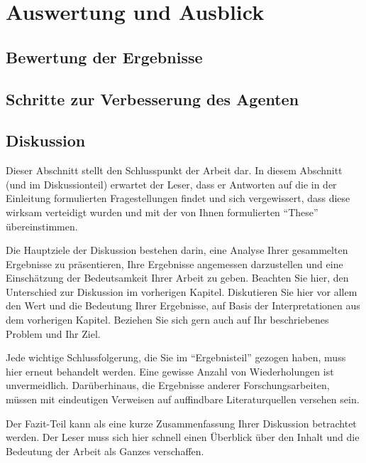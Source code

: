 

\clearpage
\chapter{Auswertung und Ausblick}


\section{Bewertung der Ergebnisse}
\section{Schritte zur Verbesserung des Agenten}
\section{Diskussion}

Dieser Abschnitt stellt den Schlusspunkt der Arbeit dar. In diesem Abschnitt (und im Diskussionteil) erwartet der Leser, 
dass er Antworten auf die in der Einleitung formulierten Fragestellungen findet und sich vergewissert, 
dass diese wirksam verteidigt wurden und mit der von Ihnen formulierten \enquote{These} übereinstimmen.

Die Hauptziele der Diskussion bestehen darin, eine Analyse Ihrer gesammelten Ergebnisse zu präsentieren, 
Ihre Ergebnisse angemessen darzustellen und eine Einschätzung der Bedeutsamkeit Ihrer Arbeit zu geben. Beachten Sie hier,
den Unterschied zur Diskussion im vorherigen Kapitel. Diskutieren Sie hier vor allem den Wert und die Bedeutung Ihrer Ergebnisse, auf Basis der 
Interpretationen aus dem vorherigen Kapitel. Beziehen Sie sich gern auch auf Ihr beschriebenes Problem und Ihr Ziel.

Jede wichtige Schlussfolgerung, die Sie im \enquote{Ergebnisteil} gezogen haben, 
muss hier erneut behandelt werden. Eine gewisse Anzahl von Wiederholungen ist unvermeidlich. Darüberhinaus, 
die Ergebnisse anderer Forschungsarbeiten, müssen mit eindeutigen Verweisen auf auffindbare Literaturquellen versehen sein.

Der Fazit-Teil kann als eine kurze Zusammenfassung Ihrer Diskussion betrachtet werden. 
Der Leser muss sich hier schnell einen Überblick über den Inhalt und die Bedeutung der Arbeit als Ganzes verschaffen.

